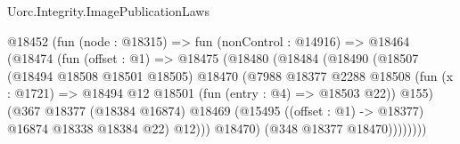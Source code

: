 \begin{lexlean}{Uorc.Integrity.ImagePublicationLaws}
\begin{coremodule}
        @18452
          (fun (node : @18315) =>
          fun (nonControl : @14916) =>
          @18464
            (@18474
              (fun (offset : @1) =>
              @18475
                (@18480
                  (@18484
                    (@18490
                      (@18507
                        (@18494 @18508 @18501 @18505)
                        @18470
                        (@7988
                          @18377
                          @2288
                          @18508
                          (fun (x : @1721) => @18494 @12 @18501 (fun (entry : @4) => @18503 @22))
                          @155)
                        (@367
                          @18377
                          (@18384 @16874)
                          @18469
                          (@15495 ((offset : @1) -> @18377) @16874 @18338 @18384 @22)
                          @12)))
                    @18470)
                  (@348 @18377 @18470))))))))
\end{coremodule}
\end{lexlean}
